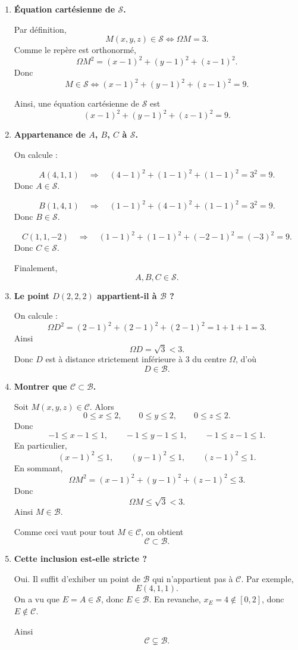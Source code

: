 \documentclass[11pt,a4paper]{article}
\newcommand{\Boule}{\mathcal{B}}
\newcommand{\Sphere}{\mathcal{S}}
\newcommand{\Cube}{\mathcal{C}}
\begin{document}
\begin{enumerate}[label=\textbf{\arabic*.}]
    \item \textbf{Équation cartésienne de \(\Sphere\).}

    Par définition,
    \[
    M(x,y,z)\in \Sphere \iff \Omega M=3.
    \]
    Comme le repère est orthonormé,
    \[
    \Omega M^2=(x-1)^2+(y-1)^2+(z-1)^2.
    \]
    Donc
    \[
    M\in \Sphere \iff (x-1)^2+(y-1)^2+(z-1)^2=9.
    \]

    Ainsi, une équation cartésienne de \(\Sphere\) est
    \[
    \boxed{(x-1)^2+(y-1)^2+(z-1)^2=9.}
    \]

    \item \textbf{Appartenance de \(A\), \(B\), \(C\) à \(\Sphere\).}

    On calcule :

    \[
    A(4,1,1)\quad\Rightarrow\quad (4-1)^2+(1-1)^2+(1-1)^2=3^2=9.
    \]
    Donc \(A\in \Sphere\).

    \[
    B(1,4,1)\quad\Rightarrow\quad (1-1)^2+(4-1)^2+(1-1)^2=3^2=9.
    \]
    Donc \(B\in \Sphere\).

    \[
    C(1,1,-2)\quad\Rightarrow\quad (1-1)^2+(1-1)^2+(-2-1)^2= (-3)^2=9.
    \]
    Donc \(C\in \Sphere\).

    Finalement,
    \[
    \boxed{A,B,C\in \Sphere.}
    \]

    \item \textbf{Le point \(D(2,2,2)\) appartient-il à \(\Boule\) ?}

    On calcule :
    \[
    \Omega D^2=(2-1)^2+(2-1)^2+(2-1)^2=1+1+1=3.
    \]
    Ainsi
    \[
    \Omega D=\sqrt3<3.
    \]
    Donc \(D\) est à distance strictement inférieure à \(3\) du centre \(\Omega\), d'où
    \[
    \boxed{D\in \Boule.}
    \]

    \item \textbf{Montrer que \(\Cube\subset \Boule\).}

    Soit \(M(x,y,z)\in \Cube\). Alors
    \[
    0\le x\le 2,\qquad 0\le y\le 2,\qquad 0\le z\le 2.
    \]
    Donc
    \[
    -1\le x-1\le 1,\qquad -1\le y-1\le 1,\qquad -1\le z-1\le 1.
    \]
    En particulier,
    \[
    (x-1)^2\le 1,\qquad (y-1)^2\le 1,\qquad (z-1)^2\le 1.
    \]
    En sommant,
    \[
    \Omega M^2=(x-1)^2+(y-1)^2+(z-1)^2\le 3.
    \]
    Donc
    \[
    \Omega M\le \sqrt3<3.
    \]
    Ainsi \(M\in \Boule\).

    Comme ceci vaut pour tout \(M\in \Cube\), on obtient
    \[
    \boxed{\Cube\subset \Boule.}
    \]

    \item \textbf{Cette inclusion est-elle stricte ?}

    Oui. Il suffit d'exhiber un point de \(\Boule\) qui n'appartient pas à \(\Cube\).  
    Par exemple,
    \[
    E(4,1,1).
    \]
    On a vu que \(E=A\in \Sphere\), donc \(E\in \Boule\). En revanche, \(x_E=4\notin [0,2]\), donc \(E\notin \Cube\).

    Ainsi
    \[
    \boxed{\Cube\subsetneq \Boule.}
    \]
\end{enumerate}
\end{document}

